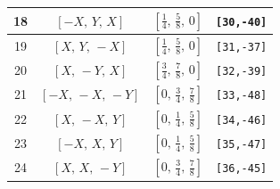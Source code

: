 \documentclass[fleqn,8pt]{jsarticle}
\begin{document}
\begin{longtable}{cccc}
18 & $\left[ - X,\, Y,\, X \right]$ & $\left[ \frac{1}{4},\, \frac{5}{8},\, 0 \right]$ & {\tt [30,-40]} \\ \hline
19 & $\left[ X,\, Y,\, - X \right]$ & $\left[ \frac{1}{4},\, \frac{5}{8},\, 0 \right]$ & {\tt [31,-37]} \\ \hline
20 & $\left[ X,\, - Y,\, X \right]$ & $\left[ \frac{3}{4},\, \frac{7}{8},\, 0 \right]$ & {\tt [32,-39]} \\ \hline
21 & $\left[ - X,\, - X,\, - Y \right]$ & $\left[ 0,\, \frac{3}{4},\, \frac{7}{8} \right]$ & {\tt [33,-48]} \\ \hline
22 & $\left[ X,\, - X,\, Y \right]$ & $\left[ 0,\, \frac{1}{4},\, \frac{5}{8} \right]$ & {\tt [34,-46]} \\ \hline
23 & $\left[ - X,\, X,\, Y \right]$ & $\left[ 0,\, \frac{1}{4},\, \frac{5}{8} \right]$ & {\tt [35,-47]} \\ \hline
24 & $\left[ X,\, X,\, - Y \right]$ & $\left[ 0,\, \frac{3}{4},\, \frac{7}{8} \right]$ & {\tt [36,-45]} \\
\end{longtable}
\renewcommand{\arraystretch}{1.2}
\end{document}
